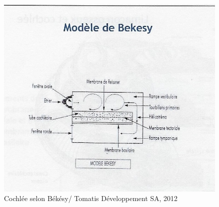 \begin{figure}
	\centering
	\includegraphics[width=1.0\linewidth]{images/Cochleederoule_bas.jpg}
	\caption[Modèle de Békésy]{Cochlée selon Békésy/ Tomatis Développement SA, 2012}
	\label{fig:cochleederoulebas}
\end{figure}

